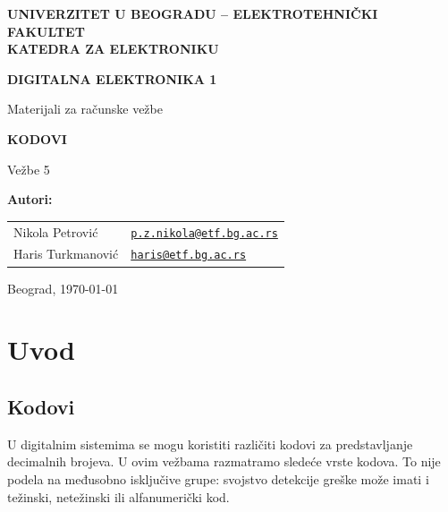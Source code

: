 \documentclass[a4paper,11pt]{article}
\numberwithin{equation}{section}
\begin{document}
\hypersetup{pageanchor=false}
\begin{titlepage}
\thispagestyle{empty}
\begin{center}
{\Large\bfseries UNIVERZITET U BEOGRADU -- ELEKTROTEHNIČKI FAKULTET\\ KATEDRA ZA ELEKTRONIKU\par}
\vspace{25mm}
{\LARGE\bfseries DIGITALNA ELEKTRONIKA 1\par}
\vspace{2mm}
{\large Materijali za računske vežbe\par}
\vspace{18mm}
{\Large\bfseries KODOVI\par}
\vspace{3mm}
{\large Vežbe 5\par}
\vfill
\begin{minipage}{0.62\linewidth}
\raggedright\textbf{Autori:}\\[4pt]\small
\begin{tabular}{@{}ll@{}}
Nikola Petrović & \href{mailto:p.z.nikola@etf.bg.ac.rs}{\texttt{p.z.nikola@etf.bg.ac.rs}}\\
Haris Turkmanović & \href{mailto:haris@etf.bg.ac.rs}{\texttt{haris@etf.bg.ac.rs}}\\
\end{tabular}
\end{minipage}\hfill
\begin{minipage}{0.34\linewidth}\raggedleft Beograd, \today\end{minipage}
\end{center}
\end{titlepage}
\hypersetup{pageanchor=true}
\tableofcontents
\newpage

\FloatBarrier
\section{Uvod}\label{sec:1}


\FloatBarrier
\subsection{Kodovi}\label{sec:1.1}


U digitalnim sistemima se mogu koristiti različiti kodovi za predstavljanje decimalnih brojeva. U ovim vežbama razmatramo sledeće vrste kodova. To nije podela na međusobno isključive grupe: svojstvo detekcije greške može imati i težinski, netežinski ili alfanumerički kod.
\end{document}
